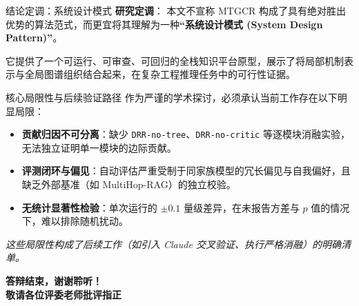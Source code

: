 \documentclass[aspectratio=169, 11pt, xcolor=table]{ctexbeamer}
\begin{document}
\begin{frame}{结论定调：系统设计模式}
    \textbf{研究定调}：
    本文不宣称 MTGCR 构成了具有绝对胜出优势的算法范式，而更宜将其理解为一种\textbf{“系统设计模式 (System Design Pattern)”}。
    
    \vspace{0.3cm}
    它提供了一个\alert{可运行、可审查、可回归的全栈知识平台原型}，展示了将局部机制表示与全局图谱组织结合起来，在复杂工程推理任务中的可行性证据。
\end{frame}

\begin{frame}{核心局限性与后续验证路径}
    作为严谨的学术探讨，必须承认当前工作存在以下明显局限：
    
    \vspace{0.3cm}
    \begin{itemize}[<+->]
        \item \textbf{贡献归因不可分离}：缺少 \texttt{DRR-no-tree}、\texttt{DRR-no-critic} 等逐模块消融实验，无法独立证明单一模块的边际贡献。
        \item \textbf{评测闭环与偏见}：自动评估严重受制于同家族模型的冗长偏见与自我偏好，且缺乏外部基准（如 MultiHop-RAG）的独立校验。
        \item \textbf{无统计显著性检验}：单次运行的 $\pm 0.1$ 量级差异，在未报告方差与 $p$ 值的情况下，难以排除随机扰动。
    \end{itemize}
    
    \vspace{0.3cm}
    \small \textit{这些局限性构成了后续工作（如引入 Claude 交叉验证、执行严格消融）的明确清单。}
\end{frame}

\begin{frame}[standout]
    \centering
    \Huge \textbf{答辩结束，谢谢聆听！}\\
    \vspace{0.2cm}
    \Large \textbf{敬请各位评委老师批评指正}
\end{frame}
\end{document}
